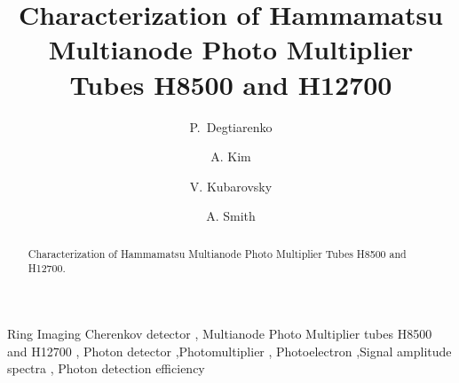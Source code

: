 \documentclass[5p,times,preprint]{elsarticle}
\begin{document}
\begin{frontmatter}
\title{Characterization of Hammamatsu Multianode Photo Multiplier Tubes H8500 and H12700}

\author[A]{P.~Degtiarenko }
\author[B]{A. Kim } 
\author[A]{V. Kubarovsky }

\author[C]{A. Smith}

\address[A]{Jefferson Lab, Newport News, Virginia, USA}
\address[B]{University of Connecticut, Storrs, CT 0626, USA}
\address[C]{Duke University, Durham, NC 2770, USA}



\begin{abstract}
Characterization of Hammamatsu Multianode Photo Multiplier Tubes H8500 and H12700.
\end{abstract}

\begin{keyword}
Ring Imaging Cherenkov detector \sep
Multianode Photo Multiplier tubes H8500 and H12700 \sep
Photon detector \sep Photomultiplier  \sep
Photoelectron  \sep  Signal amplitude spectra \sep 
Photon detection efficiency
\end{keyword}


\end{frontmatter}





\end{document}
